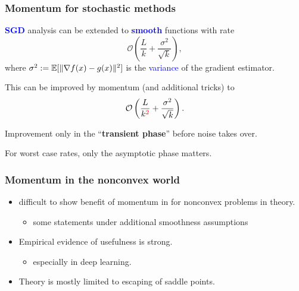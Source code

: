 \documentclass[aspectratio=149]{beamer}
\begin{document}
\begin{frame}
  \frametitle{Momentum for stochastic methods}
  \textbf{\textcolor{blue}{SGD}} analysis can be extended to \textbf{\textcolor{blue}{smooth}} functions with rate
  \begin{equation}
    \mathcal{O}\left(\frac{L}{k} + \frac{\sigma^2}{\sqrt{k}}\right),
  \end{equation}
  where $\sigma^2:= \mathbb{E} [ \Vert \nabla f(x) - g(x) \Vert^2 ]$ is the \textcolor{blue}{variance} of the gradient estimator.

  \medskip
  This can be improved by momentum (and additional tricks) to
  \begin{equation}
    \mathcal{O}\left(\frac{L}{k^{\textcolor{red}{2}}} + \frac{\sigma^2}{\sqrt{k}}\right).
  \end{equation}

  Improvement only in the ``\textbf{transient phase}'' before noise takes over.

  \begin{block}{}
    \centering
    For worst case rates, only the asymptotic phase matters.
  \end{block}

\end{frame}

\begin{frame}
  \frametitle{Momentum in the nonconvex world}

  \begin{itemize}
    \item difficult to show benefit of momentum in for nonconvex problems in theory.
    \begin{itemize}
      \item some statements under additional smoothness assumptions
    \end{itemize}
    \item Empirical evidence of usefulness is strong.
        \begin{itemize}
          \item especially in deep learning.
        \end{itemize}
    \item Theory is mostly limited to escaping of saddle points.
  \end{itemize}



\end{frame}
\end{document}
